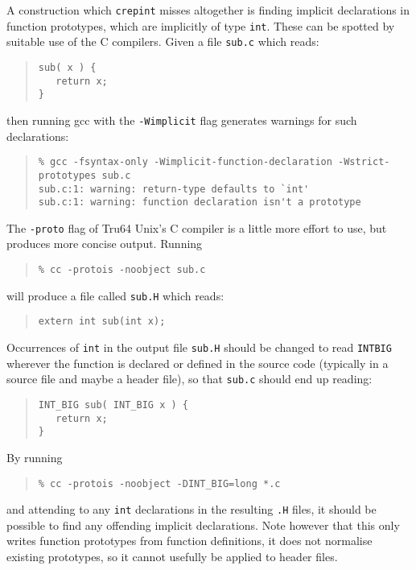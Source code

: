 \documentclass[twoside,11pt]{article}
\renewcommand{\_}{\texttt{\symbol{95}}}
\newcommand{\file}[1]{{\tt #1}}
\newcommand{\routine}[1]{{\tt #1}}
\newcommand{\cc}[1]{{\tt #1}}
\newenvironment{squote}{\begin{quote}\begin{small}}{\end{small}\end{quote}}
\begin{document}
A construction which \routine{crepint} misses altogether is finding
implicit declarations in function prototypes, which are implicitly
of type \cc{int}.
These can be spotted by suitable use of the C compilers.
Given a file \file{sub.c} which reads:
\begin{squote}
\begin{verbatim}
sub( x ) {
   return x;
}
\end{verbatim}
\end{squote}
then running gcc with the {\tt -Wimplicit} flag generates warnings for
such declarations:
\begin{squote}
\begin{verbatim}
% gcc -fsyntax-only -Wimplicit-function-declaration -Wstrict-prototypes sub.c
sub.c:1: warning: return-type defaults to `int'
sub.c:1: warning: function declaration isn't a prototype
\end{verbatim}
\end{squote}
The {\tt -proto} flag of Tru64 Unix's C compiler is a little more
effort to use, but produces more concise output.  Running
\begin{squote}
\begin{verbatim}
% cc -protois -noobject sub.c
\end{verbatim}
\end{squote}
will produce a file called \file{sub.H} which reads:
\begin{squote}
\begin{verbatim}
extern int sub(int x);
\end{verbatim}
\end{squote}
Occurrences of \cc{int} in the output file \file{sub.H} should be 
changed to read \cc{INT\_BIG} wherever the function is declared or
defined in the source code (typically in a source file and maybe a 
header file), so that \file{sub.c} should
end up reading:
\begin{squote}
\begin{verbatim}
INT_BIG sub( INT_BIG x ) {
   return x;
}
\end{verbatim}
\end{squote}
By running
\begin{squote}
\begin{verbatim}
% cc -protois -noobject -DINT_BIG=long *.c
\end{verbatim}
\end{squote}
and attending to any \cc{int} declarations in the resulting \file{.H} files,
it should be possible to find any offending implicit declarations.
Note however that this only writes function prototypes 
from function definitions, it does not normalise existing prototypes,
so it cannot usefully be applied to header files.
\end{document}
